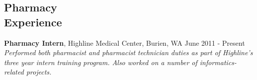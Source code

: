 \documentclass[margin,line]{resume}
\begin{document}
\begin{resume}
%
%    
%    
    


    \section{\mysidestyle Pharmacy\\Experience}


       {\bf Pharmacy Intern}, Highline Medical Center, Burien, WA \hfill June 2011 - Present\\
    {\sl Performed both pharmacist and pharmacist technician duties as part of Highline's three year intern training program. Also worked on a number of informatics-related projects.}



\end{resume}
\end{document}
